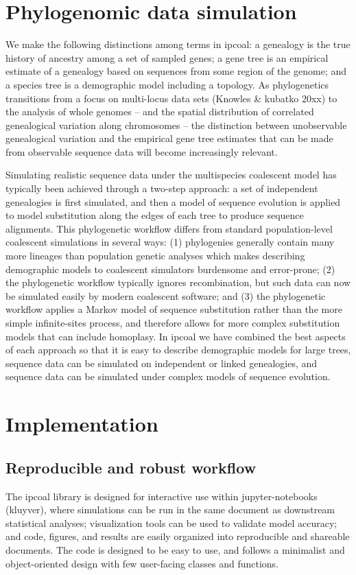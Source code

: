 \documentclass[11pt]{article}
\begin{document}
\section{Phylogenomic data simulation}
We make the following distinctions among terms in ipcoal: a genealogy is the true history of ancestry among a set of sampled genes; a gene tree is an empirical estimate of a genealogy based on sequences from some region of the genome; and a species tree is a demographic model including a topology. As phylogenetics transitions from a focus on multi-locus data sets (Knowles \& kubatko 20xx) to the analysis of whole genomes -- and the spatial distribution of correlated genealogical variation along chromosomes -- the distinction between unobservable genealogical variation and the empirical gene tree estimates that can be made from observable sequence data will become increasingly relevant. 

Simulating realistic sequence data under the multispecies coalescent model has typically been achieved through a two-step approach: a set of independent genealogies is first simulated, and then a model of sequence evolution is applied to model substitution along the edges of each tree to produce sequence alignments. This phylogenetic workflow differs from standard population-level coalescent simulations in several ways: (1) phylogenies generally contain many more lineages than population genetic analyses which makes describing demographic models to coalescent simulators burdensome and error-prone; (2) the phylogenetic workflow typically ignores recombination, but such data can now be simulated easily by modern coalescent software; and (3) the phylogenetic workflow applies a Markov model of sequence substitution rather than the more simple infinite-sites process, and therefore allows for more complex substitution models that can include homoplasy. In ipcoal we have combined the best aspects of each approach so that it is easy to describe demographic models for large trees, sequence data can be simulated on independent or linked genealogies, and sequence data can be simulated under complex models of sequence evolution. 

\section{Implementation}
\label{sec:headings}
\subsection{Reproducible and robust workflow}
The ipcoal library is designed for interactive use within jupyter-notebooks (kluyver), where simulations can be run in the same document as downstream statistical analyses; visualization tools can be used to validate model accuracy; and code, figures, and results are easily organized into reproducible and shareable documents. The code is designed to be easy to use, and follows a minimalist and object-oriented design with few user-facing classes and functions.
\end{document}
